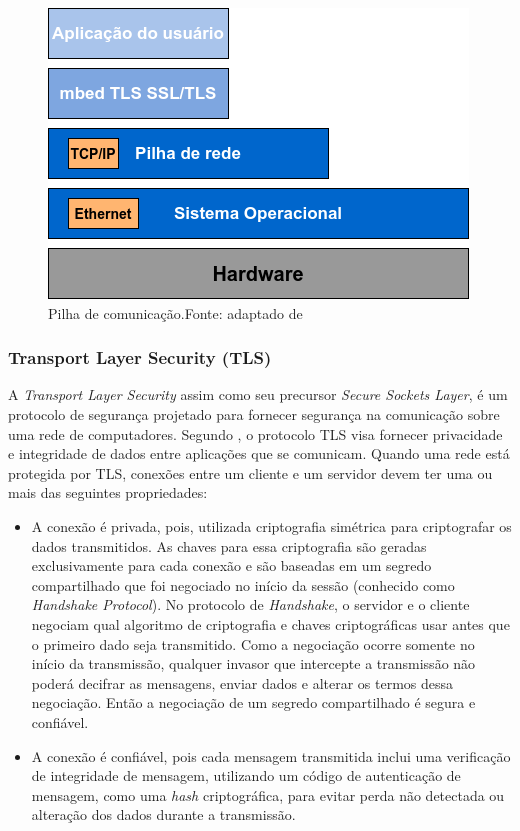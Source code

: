 \begin{figure}[H]
    \scriptsize
     \centering
     \includegraphics[scale=0.6]{dados/figuras/mbedtls.png}
     \caption{Pilha de comunicação.\newline Fonte: adaptado de \cite{mbedtls}}
     \label{mbedtlsFig}
\end{figure}



\subsubsection{Transport Layer Security (TLS)}

A \textit{Transport Layer Security} assim como seu precursor \textit{Secure Sockets Layer}, é um protocolo de segurança projetado para fornecer segurança na comunicação sobre uma rede de computadores.
Segundo , o protocolo TLS visa fornecer privacidade e integridade de dados entre aplicações que se comunicam. Quando uma rede está protegida por TLS, conexões entre um cliente e um servidor devem ter uma ou mais das seguintes propriedades:

\begin{itemize}
    \item A conexão é privada, pois, utilizada criptografia simétrica para criptografar os dados transmitidos. As chaves para essa criptografia são geradas exclusivamente para cada conexão e são baseadas em um segredo compartilhado que foi negociado no início da sessão (conhecido como \textit{Handshake Protocol}). No protocolo de \textit{Handshake}, o servidor e o cliente negociam qual algoritmo de criptografia e chaves criptográficas usar antes que o primeiro dado seja transmitido. Como a negociação ocorre somente no início da transmissão, qualquer invasor que intercepte a transmissão não poderá decifrar as mensagens, enviar dados e alterar os termos dessa negociação. Então a negociação de um segredo compartilhado é segura  e confiável.
    \item A conexão é confiável, pois cada mensagem transmitida inclui uma verificação de integridade de mensagem, utilizando um código de autenticação de mensagem, como uma \textit{hash} criptográfica, para evitar perda não detectada ou alteração dos dados durante a transmissão.
\end{itemize}

